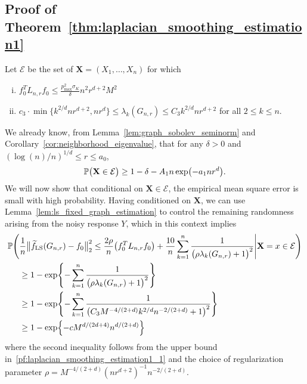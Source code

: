\documentclass[twoside]{article}
\newcommand{\1}{\mathbf{1}}
\newcommand{\Lap}{L}
\newcommand{\mc}[1]{\mathcal{#1}}
\newcommand{\Pbb}{\mathbb{P}}
\newcommand{\wt}[1]{\widetilde{#1}}
\newcommand{\LS}{\mathrm{LS}}
\theoremstyle{definition}
\theoremstyle{remark}
\begin{document}
\subsection{Proof of Theorem~\ref{thm:laplacian_smoothing_estimation1}}
\label{subsec:laplacian_smoothing_estimation1_pf}
Let $\mc{E}$ be the set of $\mathbf{X} = (X_1,\ldots,X_n)$ for which
\begin{enumerate}[(i)]
	\item
	\label{pf:laplacian_smoothing_estimation1_0}
	$f_0^T \Lap_{n,r} f_0 \leq \frac{p_{\max}^2 \sigma_K}{\delta} n^2 r^{d + 2}M^2$
	\item 
	\label{pf:laplacian_smoothing_estimation1_1}
	$c_3 \cdot \min\{k^{2/d}nr^{d+2},nr^d\} \leq \lambda_k(G_{n,r}) \leq C_3k^{2/d}nr^{d + 2} $ for all $2 \leq k \leq n$.
\end{enumerate}
We already know, from Lemma~\ref{lem:graph_sobolev_seminorm} and Corollary~\ref{cor:neighborhood_eigenvalue}, that for any $\delta > 0$ and $(\log(n)/n)^{1/d} \leq r \leq a_0$,
\begin{equation}
\label{pf:laplacian_smoothing_estimation1_1.5}
\Pbb\bigl({\bf X} \in \mc{E}\bigr) \geq 1 - \delta - A_1n\exp\bigl(-a_1nr^d\bigr).
\end{equation}
We will now show that conditional on $\mathbf{X} \in \mc{E}$, the empirical mean square error is small with high probability. Having conditioned on $\mathbf{X}$, we can use Lemma~\ref{lem:ls_fixed_graph_estimation} to control the remaining randomness arising from the noisy response $Y$, which in this context implies
\begin{equation}
\label{pf:laplacian_smoothing_estimation1_2}
\begin{aligned}
\Pbb\Biggl(& \frac{1}{n}\bigl\|\wt{f}_{\LS}(G_{n,r}) - f_0\bigr\|_2^2 \leq \frac{2\rho}{n} \bigl(f_0^T \Lap_{n,r} f_0\bigr) + \frac{10}{n}\sum_{k = 1}^{n} \frac{1}{\bigl(\rho \lambda_{k}(G_{n,r}) + 1\bigr)^2} \Bigg| \mathbf{X} = x \in \mc{E}\Biggr) \\
& \geq 1 - \exp\Biggl\{-\sum_{k = 1}^{n}\frac{1}{\bigl(\rho \lambda_k(G_{n,r}) + 1\bigr)^2}\Biggr\} \\
& \geq 1 - \exp\Biggl\{-\sum_{k = 1}^{n}\frac{1}{\bigl(C_3M^{-4/(2+d)}k^{2/d}n^{-2/(2+d)} + 1\bigr)^2}\Biggr\} \\
& \geq 1 - \exp\Bigl\{-c M^{d/(2d + 4)} n^{d/(2+d)}\Bigr\}
\end{aligned}
\end{equation}
where the second inequality follows from the upper bound in~\ref{pf:laplacian_smoothing_estimation1_1} and the choice of regularization parameter $\rho = M^{-4/(2+d)}(nr^{d+2})^{-1}n^{-2/(2+d)}$. 
\end{document}
